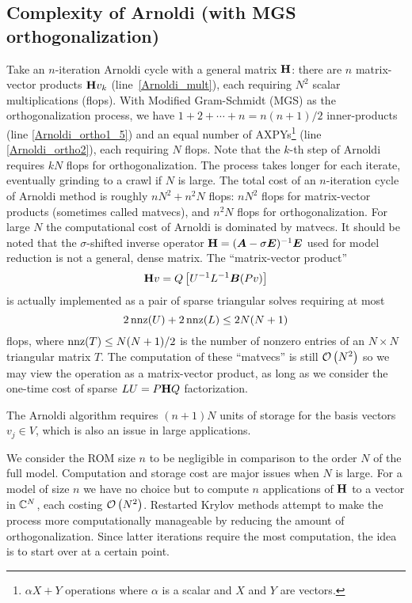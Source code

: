 \subsection{Complexity of Arnoldi (with MGS orthogonalization)}\label{sec:complexity1}
Take an $n$-iteration Arnoldi cycle with a general matrix $\textbf{\textup{H}}$: there are $n$ matrix-vector products $\textbf{\textup{H}} v_k$ (line~\ref{Arnoldi_mult}),  each requiring $N^2$ scalar multiplications (flops). With Modified Gram-Schmidt (MGS) as the orthogonalization process, we have $1+2+\cdots+n = n(n+1)/2$ inner-products (line \ref{Arnoldi_ortho1_5}) and an equal number of AXPYs\footnote{$\alpha X+Y$ operations where $\alpha$ is a scalar and $X$ and $Y$ are vectors.} (line \ref{Arnoldi_ortho2}), each requiring  $N$ flops.   Note that the $k$-th step of Arnoldi requires $kN$ flops for orthogonalization.  The process takes longer for each iterate, eventually grinding to a crawl if $N$ is large.  The total cost of an $n$-iteration cycle of Arnoldi method is roughly 
$n N^2 + n^2 N$
flops: 
$n N^2$ flops for matrix-vector products (sometimes called matvecs), and $n^2 N$ flops for  orthogonalization.    For large $N$ the computational cost of Arnoldi is dominated by matvecs.   It should be noted that the $\sigma$-shifted inverse operator $\textbf{\textup{H}} = (\bm{A} - \sigma \bm{E})^{-1}\bm{E}$ used for model reduction is not a general, dense matrix.   The ``matrix-vector product'' 
\[
\textbf{\textup{H}} v = Q \left[ U^{-1}L^{-1} \bm{B} (Pv) \right] 
\]
is actually implemented as a pair of sparse triangular solves requiring at most 
\[
2\operatorname*{nnz}(U)+2\operatorname*{nnz}(L) \leq 2N(N+1)
\]
 flops, where $\operatorname*{nnz}(T)\leq N(N+1)/2$ is the number of nonzero entries of an $N\times N$ triangular matrix $T$.    The computation of these ``matvecs'' is still $\mathcal{O}\left( N^2 \right)$ so we may view the operation as a matrix-vector product, as long as we consider the one-time cost of sparse $LU= P \textbf{\textup{H}} Q$ factorization. 

 The Arnoldi algorithm requires $(n+1)N$ units of storage for the basis vectors $v_j\in V$, which is also an issue in large applications. 
  
We consider the ROM size $n$ to be negligible in comparison to the order $N$ of the full model.  Computation and storage cost are major issues when $N$ is large.  For a model of size $n$ we have no choice but to compute $n$ applications of $\textbf{\textup{H}}$ to a vector in $\mathbb{C}^N$, each costing $\mathcal{O}\left( N^2 \right)$.  Restarted  Krylov methods attempt to make the process more computationally manageable by reducing the  amount of orthogonalization.  Since latter iterations require the most computation, the idea is to start over at a certain point. 


